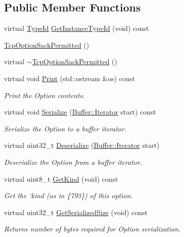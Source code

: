 \subsection*{Public Member Functions}
\begin{DoxyCompactItemize}
\item 
virtual \hyperlink{classns3_1_1TypeId}{Type\+Id} \hyperlink{classns3_1_1TcpOptionSackPermitted_a2dad6020d6f5d0db682febd25f0bfb9c}{Get\+Instance\+Type\+Id} (void) const 
\item 
\hyperlink{classns3_1_1TcpOptionSackPermitted_ab21c6fae81154a665a8929e21d6d6b4b}{Tcp\+Option\+Sack\+Permitted} ()
\item 
virtual \hyperlink{classns3_1_1TcpOptionSackPermitted_aac0877602b944bef58bccd90c467b42a}{$\sim$\+Tcp\+Option\+Sack\+Permitted} ()
\item 
virtual void \hyperlink{classns3_1_1TcpOptionSackPermitted_a6478b3fd355b92bc7493f604c45d4ef4}{Print} (std\+::ostream \&os) const 
\begin{DoxyCompactList}\small\item\em Print the Option contents. \end{DoxyCompactList}\item 
virtual void \hyperlink{classns3_1_1TcpOptionSackPermitted_ab00be0ac26a17085142b804090eab53c}{Serialize} (\hyperlink{classns3_1_1Buffer_1_1Iterator}{Buffer\+::\+Iterator} start) const 
\begin{DoxyCompactList}\small\item\em Serialize the Option to a buffer iterator. \end{DoxyCompactList}\item 
virtual uint32\+\_\+t \hyperlink{classns3_1_1TcpOptionSackPermitted_aea01c85a14c4b799cddb58d786bdb3b0}{Deserialize} (\hyperlink{classns3_1_1Buffer_1_1Iterator}{Buffer\+::\+Iterator} start)
\begin{DoxyCompactList}\small\item\em Deserialize the Option from a buffer iterator. \end{DoxyCompactList}\item 
virtual uint8\+\_\+t \hyperlink{classns3_1_1TcpOptionSackPermitted_ace1d9e9a5cf556db5ea6d71cc333d907}{Get\+Kind} (void) const 
\begin{DoxyCompactList}\small\item\em Get the `kind\textquotesingle{} (as in \{793\}) of this option. \end{DoxyCompactList}\item 
virtual uint32\+\_\+t \hyperlink{classns3_1_1TcpOptionSackPermitted_ab1b3f912f84dbabb912e8a667883c275}{Get\+Serialized\+Size} (void) const 
\begin{DoxyCompactList}\small\item\em Returns number of bytes required for Option serialization. \end{DoxyCompactList}\end{DoxyCompactItemize}
